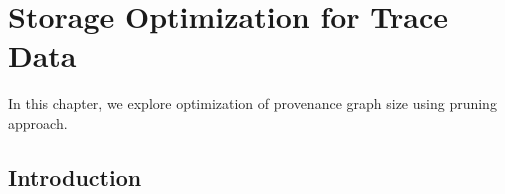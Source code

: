 
\chapter{Storage Optimization for Trace Data} \label{MostNarrowEasy}

In this chapter, we explore optimization of provenance graph size using pruning approach. 


\section{Introduction}


